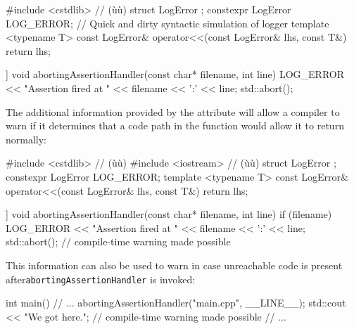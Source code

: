 \begin{emcppshiddenlisting}[emcppsbatch=e2]
#include <cstdlib>  // (ù{}ù)
struct LogError {};
constexpr LogError LOG_ERROR; // Quick and dirty syntactic simulation of logger
template <typename T>
const LogError& operator<<(const LogError& lhs, const T&) { return lhs; }
\end{emcppshiddenlisting}
\begin{emcppslisting}[emcppsbatch=e2]
[[noreturn]] void abortingAssertionHandler(const char* filename, int line)
{
    LOG_ERROR << "Assertion fired at " << filename << ':' << line;
    std::abort();
}
\end{emcppslisting}


\noindent The additional information provided by the attribute will allow a
compiler to warn if it determines that a code path in the
function would allow it to return normally:

\begin{emcppshiddenlisting}[emcppsbatch=e3]
#include <cstdlib>   // (ù{}ù)
#include <iostream>  // (ù{}ù)
struct LogError {};
constexpr LogError LOG_ERROR;
template <typename T>
const LogError& operator<<(const LogError& lhs, const T&) { return lhs; }
\end{emcppshiddenlisting}
\begin{emcppslisting}[emcppsbatch=e3]
[[noreturn]] void abortingAssertionHandler(const char* filename, int line)
{
    if (filename)
    {
        LOG_ERROR << "Assertion fired at " << filename << ':' << line;
        std::abort();
    }
}  // compile-time warning made possible
\end{emcppslisting}



\noindent This information can also be used to warn in case unreachable code is
present after\linebreak[4] \lstinline!abortingAssertionHandler! is invoked:

\begin{emcppslisting}[emcppsbatch=e3]
int main()
{
    // ...
    abortingAssertionHandler("main.cpp", __LINE__);
    std::cout << "We got here.\n";  // compile-time warning made possible
    // ...
}
\end{emcppslisting}


